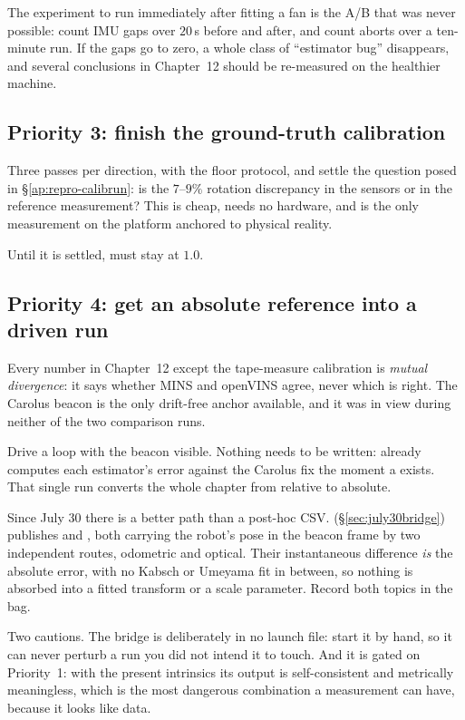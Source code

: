 The experiment to run immediately after fitting a fan is the A/B that was never
possible: count IMU gaps over $20$\,s before and after, and count
 aborts over a ten-minute run. If the gaps go to zero,
a whole class of ``estimator bug'' disappears, and several conclusions in
Chapter~12 should be re-measured on the healthier machine.

\subsection{Priority 3: finish the ground-truth calibration}
Three passes per direction, with the floor protocol, and settle the question
posed in \S\ref{ap:repro-calibrun}: is the $7$--$9\%$ rotation discrepancy in
the sensors or in the reference measurement? This is cheap, needs no hardware,
and is the only measurement on the platform anchored to physical reality.

Until it is settled,  must stay at $1.0$.

\subsection{Priority 4: get an absolute reference into a driven run}
Every number in Chapter~12 except the tape-measure calibration is
\emph{mutual divergence}: it says whether MINS and openVINS agree, never which
is right. The Carolus beacon is the only drift-free anchor available, and it was
in view during neither of the two comparison runs.

Drive a loop with the beacon visible. Nothing needs to be written:
 already computes each estimator's error against the
Carolus fix the moment a  exists. That single run converts
the whole chapter from relative to absolute.

Since July 30 there is a better path than a post-hoc CSV.
 (\S\ref{sec:july30bridge}) publishes
 and , both carrying the
robot's pose in the beacon frame by two independent routes, odometric and
optical. Their instantaneous difference \emph{is} the absolute error, with no
Kabsch or Umeyama fit in between, so nothing is absorbed into a fitted
transform or a scale parameter. Record both topics in the bag.

Two cautions. The bridge is deliberately in no launch file: start it by hand,
so it can never perturb a run you did not intend it to touch. And it is gated
on Priority~1: with the present intrinsics its output is self-consistent
and metrically meaningless, which is the most dangerous combination a
measurement can have, because it looks like data.

